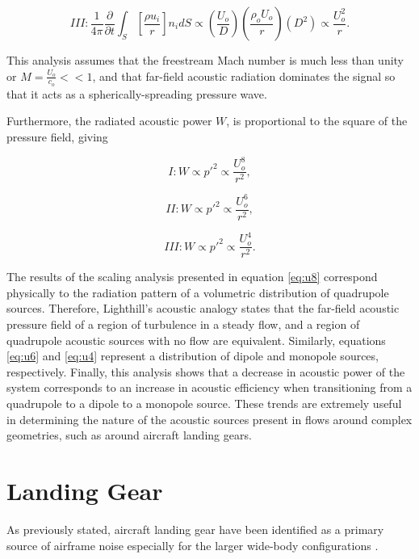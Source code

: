 \begin{equation}
III : \frac{1}{4\pi} \frac{\partial}{\partial t} \int_S \left[ \frac{\rho u_i}{r} \right] n_i dS \propto \left( \frac{U_o}{D} \right) \left( \frac{\rho_o U_o}{r} \right) \left( D^2 \right) \propto \frac{U_o^2}{r}.
\end{equation}

This analysis assumes that the freestream Mach number is much less than unity or $M = \frac{U_o}{c_o} << 1$, and that far-field acoustic radiation dominates the signal so that it acts as a spherically-spreading pressure wave. 

Furthermore, the radiated acoustic power $W$, is proportional to the square of the pressure field, giving

\begin{equation} \label{eq:u8}
I : W \propto p'^2 \propto \frac{U_o^8}{r^2},
\end{equation}

\begin{equation} \label{eq:u6}
II : W \propto p'^2 \propto \frac{U_o^6}{r^2},
\end{equation}

\begin{equation} \label{eq:u4}
III : W \propto p'^2 \propto \frac{U_o^4}{r^2}.
\end{equation}

The results of the scaling analysis presented in equation \ref{eq:u8} correspond physically to the radiation pattern of a volumetric distribution of quadrupole sources. Therefore, Lighthill's acoustic analogy states that the far-field acoustic pressure field of a region of turbulence in a steady flow, and  a region of quadrupole acoustic sources with no flow are equivalent. Similarly, equations \ref{eq:u6} and \ref{eq:u4} represent a distribution of dipole and monopole sources, respectively. Finally, this analysis shows that a decrease in acoustic power of the system corresponds to an increase in acoustic efficiency when transitioning from a quadrupole to a dipole to a monopole source. These trends are extremely useful in determining the nature of the acoustic sources present in flows around complex geometries, such as around aircraft landing gears.

\section{Landing Gear}
As previously stated, aircraft landing gear have been identified as a primary source of airframe noise especially for the larger wide-body configurations \cite{}. 

